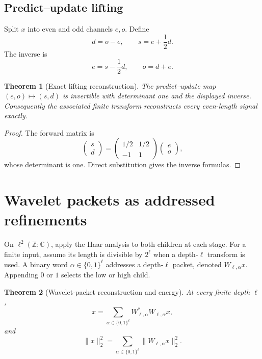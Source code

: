 \documentclass[11pt,letterpaper]{article}
\newtheorem{theorem}{Theorem}[section]
\theoremstyle{plain}
\theoremstyle{plain}
\theoremstyle{plain}
\theoremstyle{definition}
\theoremstyle{definition}
\theoremstyle{definition}
\theoremstyle{definition}
\theoremstyle{remark}
\theoremstyle{remark}
\theoremstyle{remark}
\theoremstyle{remark}
\newcommand{\bbC}{\mathbb C}
\newcommand{\bbZ}{\mathbb Z}
\begin{document}
\subsection{Predict--update lifting}

Split $x$ into even and odd channels $e,o$. Define
\[
d=o-e,
\qquad
s=e+\frac12d.
\]
The inverse is
\[
e=s-\frac12d,
\qquad
o=d+e.
\]

\begin{theorem}[Exact lifting reconstruction]\label{result:08}
The predict--update map $(e,o)\mapsto(s,d)$ is invertible with determinant one and the displayed inverse. Consequently the associated finite transform reconstructs every even-length signal exactly.
\end{theorem}

\begin{proof}
The forward matrix is
\[
\begin{pmatrix}s\\d\end{pmatrix}
=
\begin{pmatrix}1/2&1/2\\-1&1\end{pmatrix}
\begin{pmatrix}e\\o\end{pmatrix},
\]
whose determinant is one. Direct substitution gives the inverse formulas.
\end{proof}

\section{Wavelet packets as addressed refinements}\label{core:section:05}

On $\ell^2(\bbZ;\bbC)$, apply the Haar analysis to both children at each stage. For a finite input, assume its length is divisible by $2^\ell$ when a depth-$\ell$ transform is used. A binary word $\alpha\in\{0,1\}^{\ell}$ addresses a depth-$\ell$ packet, denoted $W_{\ell,\alpha}x$. Appending $0$ or $1$ selects the low or high child.

\begin{theorem}[Wavelet-packet reconstruction and energy]\label{result:09}
At every finite depth $\ell$,
\[
\boxed{
x=\sum_{\alpha\in\{0,1\}^{\ell}}W_{\ell,\alpha}^{*}W_{\ell,\alpha}x,
}
\]
and
\[
\boxed{
\|x\|_2^2
=
\sum_{\alpha\in\{0,1\}^{\ell}}
\|W_{\ell,\alpha}x\|_2^2.
}
\]
\end{theorem}
\end{document}
